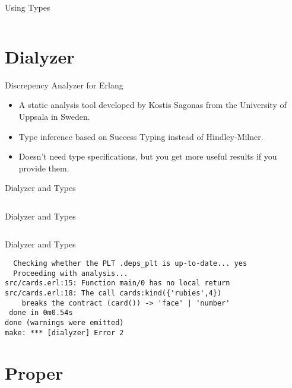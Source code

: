 \documentclass{beamer}
\begin{document}
\begin{frame}{Using Types}

  \inputminted[firstline=8, lastline=9]{erlang}{src/cards.erl}

\end{frame}


\section{Dialyzer}


\begin{frame}{Discrepency Analyzer for Erlang}

  \begin{itemize}[<+->]
  \item A static analysis tool developed by Kostis Sagonas from the
    University of Uppsala in Sweden.
  \item Type inference based on Success Typing instead of
    Hindley-Milner.
  \item Doesn't need type specifications, but you get more useful
    results if you provide them.
  \end{itemize}

\end{frame}


\begin{frame}{Dialyzer and Types}

  \inputminted[firstline=4, lastline=6]{erlang}{src/cards.erl}

\end{frame}

\begin{frame}{Dialyzer and Types}

  \inputminted[firstline=11]{erlang}{src/cards.erl}

\end{frame}

\begin{frame}[fragile]{Dialyzer and Types}

  \begin{verbatim}
  Checking whether the PLT .deps_plt is up-to-date... yes
  Proceeding with analysis...
src/cards.erl:15: Function main/0 has no local return
src/cards.erl:18: The call cards:kind({'rubies',4})
    breaks the contract (card()) -> 'face' | 'number'
 done in 0m0.54s
done (warnings were emitted)
make: *** [dialyzer] Error 2
  \end{verbatim}

\end{frame}

\section{Proper}
\end{document}
